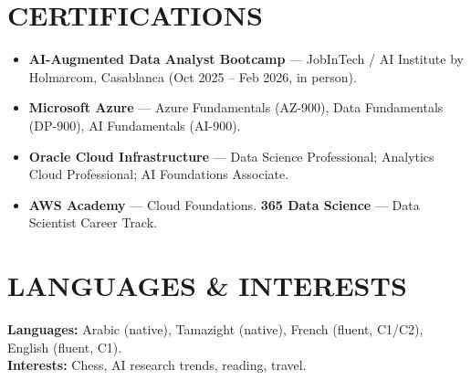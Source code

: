 \documentclass[10pt,a4paper]{article}
\begin{document}
\section*{CERTIFICATIONS}
\small
\begin{itemize}
    \item \textbf{AI-Augmented Data Analyst Bootcamp} — JobInTech / AI Institute by Holmarcom, Casablanca {\footnotesize(Oct 2025 – Feb 2026, in person)}.
    \item \textbf{Microsoft Azure} — Azure Fundamentals (AZ-900), Data Fundamentals (DP-900), AI Fundamentals (AI-900).
    \item \textbf{Oracle Cloud Infrastructure} — Data Science Professional; Analytics Cloud Professional; AI Foundations Associate.
    \item \textbf{AWS Academy} — Cloud Foundations. \quad \textbf{365 Data Science} — Data Scientist Career Track.
\end{itemize}

\section*{LANGUAGES \& INTERESTS}
\small
\textbf{Languages:} Arabic (native), Tamazight (native), French (fluent, C1/C2), English (fluent, C1). \\ \textbf{Interests:} Chess, AI research trends, reading, travel.
\end{document}
